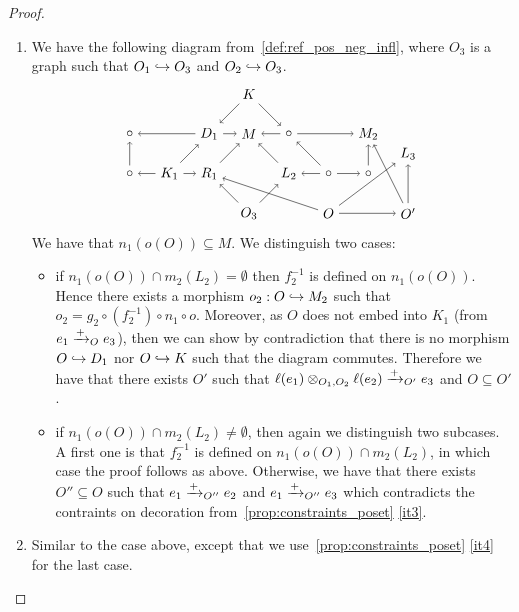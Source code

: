 \begin{proof}
  \begin{enumerate}
  \item We have the following diagram from~\autoref{def:ref_pos_neg_infl}, where $O_3$ is a graph such that $O_1\hookrightarrow O_3$ and $O_2\hookrightarrow O_3$.
    \[
    \begin{tikzpicture} %
      \node (o) at (0,-1) {\(O_3\)};
      \node (m) at (0,1) {\(M\)};
      \node (d2) at (1,1) {\(\circ\)};
      \node (m2) at (3,1) {\(M_2\)};
      \node (d1) at (-1,1) {\(D_1\)};
      \node (m1) at (-3,1) {\(\circ\)};
      \node (r1) at (-1,0) {\(R_1\)};
      \node (k1) at (-2,0) {\(K_1\)};
      \node (l1) at (-3,0) {\(\circ\)};
      \node (l2) at (1,0) {\(L_2\)};
      \node (k2) at (2,0) {\(\circ\)};
      \node (r2) at (3,0) {\(\circ\)};
      \node (k) at (0,2) {\(K\)};
      \node (l3) at (4,0.5) {\(L_3\)};
      \node (o2) at (2,-1) {\(O\)};
      \node (o1) at (4,-1) {\(O'\)};
      \draw [->] (o) -- (r1);
      \draw [->] (o) -- (l2);
      \draw [->] (r1) -- (m);
      \draw [->] (k1) -- (r1);
      \draw [->] (k1) -- (l1);
      \draw [->] (k1) -- (d1);
      \draw [->] (l1) -- (m1);
      \draw [->] (l2) -- (m);
      \draw [->] (k2) -- (r2);
      \draw [->] (k2) -- (l2);
      \draw [->] (k2) -- (d2);
      \draw [->] (r2) -- (m2);
      \draw [->] (d1) -- (m);
      \draw [->] (d1) -- (m1);
      \draw [->] (d2) -- (m);
      \draw [->] (d2) -- (m2);
      \draw [->] (k) -- (d1);
      \draw [->] (k) -- (d2);
      \draw [->] (o2) -- (o1);
      \draw [->] (o2) -- (l3);
      \draw [->] (o1) -- (l3);
      \draw [->] (o2) -- (r1);
      \draw [->] (o1) -- (m2);
    \end{tikzpicture}
    \]
    We have that $n_1(o(O))\subseteq M$. We distinguish two cases:
    \begin{itemize}
    \item if $n_1(o(O)) \cap m_2(L_2)=\emptyset$ then $f_2^{-1}$ is defined on $n_1(o(O))$. Hence there exists a morphism $o_2:O\hookrightarrow M_2$ such that $o_2 = g_2 \circ (f_2^{-1}) \circ n_1 \circ o$. Moreover, as $O$ does not embed into $K_1$ (from $e_1\mathrel{\xrightarrow{+}}_O e_3$), then we can show by contradiction that there is no morphism $O\hookrightarrow D_1$ nor $O\hookrightarrow K$ such that the diagram commutes. Therefore we have that there exists $O'$ such that $\ell(e_1)\otimes_{O_1,O_2} \ell(e_2)\mathrel{\xrightarrow{+}}_{O'} e_3$ and $O\subseteq O'$.
    \item if $n_1(o(O)) \cap m_2(L_2)\neq\emptyset$, then again we distinguish two subcases. A first one is that $f_2^{-1}$ is defined on $n_1(o(O)) \cap m_2(L_2)$, in which case the proof follows as above. Otherwise, we have that there exists $O''\subseteq O$ such that $e_1\mathrel{\xrightarrow{+}}_{O''} e_2$ and $e_1\mathrel{\xrightarrow{+}}_{O''} e_3$ which contradicts the contraints on decoration from~\autoref{prop:constraints_poset} \autoref{it3}.
    \end{itemize}
    \item Similar to the case above, except that we use~\autoref{prop:constraints_poset} \autoref{it4} for the last case.
  \end{enumerate}

\end{proof}

